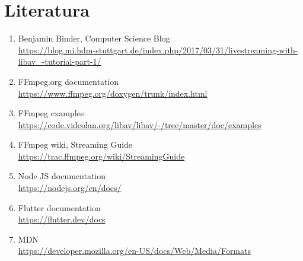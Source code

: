 \section{Literatura}

\begin{enumerate}
  \item Benjamin Binder, Computer Science Blog \\
  \url{https://blog.mi.hdm-stuttgart.de/index.php/2017/03/31/livestreaming-with-libav_-tutorial-part-1/}
  \item FFmpeg.org documentation \\
  \url{https://www.ffmpeg.org/doxygen/trunk/index.html}
  \item FFmpeg examples \\
  \url{https://code.videolan.org/libav/libav/-/tree/master/doc/examples}
  \item FFmpeg wiki, Streaming Guide \\
  \url{https://trac.ffmpeg.org/wiki/StreamingGuide}
  \item Node JS documentation  \\
  \url{https://nodejs.org/en/docs/}
  \item Flutter documentation \\
  \url{https://flutter.dev/docs}
  \item MDN \\
  \url{https://developer.mozilla.org/en-US/docs/Web/Media/Formats}
\end{enumerate}